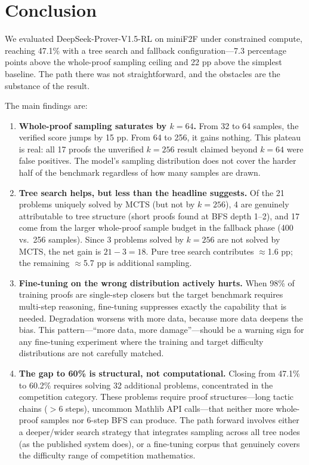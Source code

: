 \documentclass[openany, amssymb, psamsfonts]{amsart}
\theoremstyle{definition}
\numberwithin{equation}{section}
\begin{document}
\section{Conclusion}

We evaluated DeepSeek-Prover-V1.5-RL on miniF2F under constrained compute,
reaching 47.1\% with a tree search and fallback configuration---7.3 percentage
points above the whole-proof sampling ceiling and 22 pp above the simplest
baseline.
The path there was not straightforward, and the obstacles are the
substance of the result.

The main findings are:

\begin{enumerate}
\item \textbf{Whole-proof sampling saturates by $k=64$.}
From 32 to 64 samples, the verified score jumps by 15 pp.
From 64 to 256, it gains nothing.
This plateau is real: all 17 proofs the unverified $k=256$ result claimed
beyond $k=64$ were false positives.
The model's sampling distribution does not cover the harder half of the
benchmark regardless of how many samples are drawn.

\item \textbf{Tree search helps, but less than the headline suggests.}
Of the 21 problems uniquely solved by MCTS (but not by $k=256$), 4 are
genuinely attributable to tree structure (short proofs found at BFS depth 1--2),
and 17 come from the larger whole-proof sample budget in the fallback phase
(400 vs.\ 256 samples).
Since 3 problems solved by $k=256$ are not solved by MCTS, the net gain is
$21 - 3 = 18$.
Pure tree search contributes $\approx$1.6 pp; the remaining $\approx$5.7 pp is
additional sampling.

\item \textbf{Fine-tuning on the wrong distribution actively hurts.}
When 98\% of training proofs are single-step closers but the target
benchmark requires multi-step reasoning, fine-tuning suppresses exactly
the capability that is needed.
Degradation worsens with more data, because more data deepens the bias.
This pattern---``more data, more damage''---should be a warning sign for
any fine-tuning experiment where the training and target difficulty
distributions are not carefully matched.

\item \textbf{The gap to 60\% is structural, not computational.}
Closing from 47.1\% to 60.2\% requires solving 32 additional problems,
concentrated in the competition category.
These problems require proof structures---long tactic chains ($>6$ steps),
uncommon Mathlib API calls---that neither more whole-proof samples nor
6-step BFS can produce.
The path forward involves either a deeper/wider search strategy that
integrates sampling across all tree nodes (as the published system does),
or a fine-tuning corpus that genuinely covers the difficulty range of
competition mathematics.
\end{enumerate}
\end{document}
